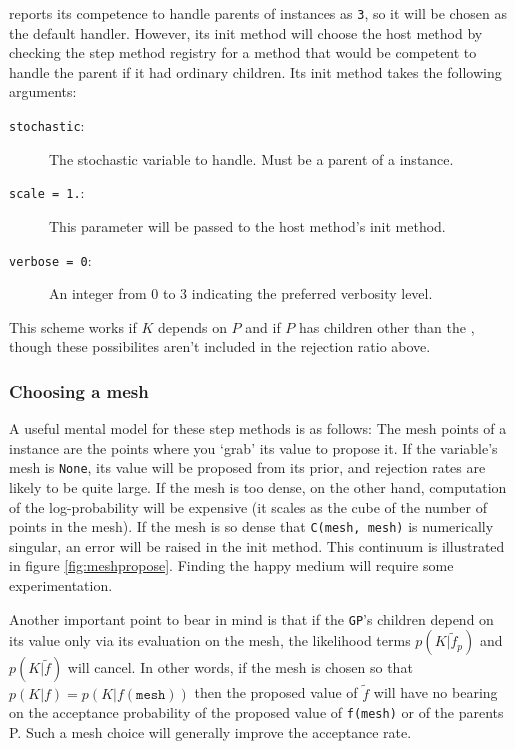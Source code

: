 \documentclass[]{manual}
\begin{document}
 reports its competence to handle parents of  instances as \texttt{3}, so it will be chosen as the default handler. However, its init method will choose the host method by checking the step method registry for a method that would be competent to handle the parent if it had ordinary children. Its init method takes the following arguments:
\begin{description}
    \item[\texttt{stochastic}:] The stochastic variable to handle. Must be a parent of a  instance.
    \item[\texttt{scale = 1.}:] This parameter will be passed to the host method's init method.
    \item[\texttt{verbose = 0}:] An integer from 0 to 3 indicating the preferred verbosity level.
\end{description}

This scheme works if $K$ depends on $P$ and if $P$ has children other than the , though these possibilites aren't included in the rejection ratio above.

\subsubsection{Choosing a mesh} A useful mental model for these step methods is as follows: The mesh points of a  instance are the points where you `grab' its value to propose it. If the variable's mesh is \texttt{None}, its value will be proposed from its prior, and rejection rates are likely to be quite large. If the mesh is too dense, on the other hand, computation of the log-probability will be expensive (it scales as the cube of the number of points in the mesh). If the mesh is so dense that \texttt{C(mesh, mesh)} is numerically singular, an error will be raised in the init method. This continuum is illustrated in figure \ref{fig:meshpropose}. Finding the happy medium will require some experimentation.

Another important point to bear in mind is that if the \texttt{GP}'s children depend on its value only via its evaluation on the mesh, the likelihood terms $p(K|\tilde f_p)$ and $p(K|\tilde f)$ will cancel. In other words, if the mesh is chosen so that $p(K|f)=p(K|f(\texttt{mesh}))$ then the proposed value of $\tilde f$ will have no bearing on the acceptance probability of the proposed value of \texttt{f(mesh)} or of the parents P. Such a mesh choice will generally improve the acceptance rate.
\end{document}
